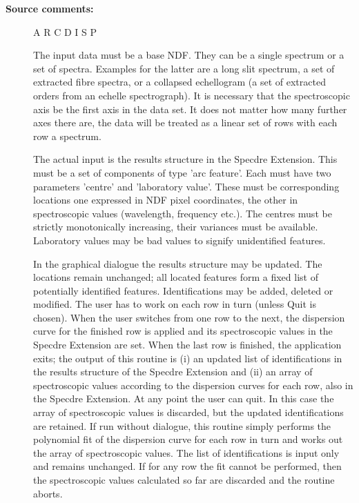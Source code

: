 \begin{description}
\begin{description}
\end{description}

\item [\textbf{Source comments:}]
\begin{terminalv}
   A R C D I S P

   The input data must be a base NDF. They can be a single spectrum
   or a set of spectra. Examples for the latter are a long slit
   spectrum, a set of extracted fibre spectra, or a collapsed
   echellogram (a set of extracted orders from an echelle
   spectrograph). It is necessary that the spectroscopic axis be the
   first axis in the data set. It does not matter how many further
   axes there are, the data will be treated as a linear set of rows
   with each row a spectrum.

   The actual input is the results structure in the Specdre
   Extension. This must be a set of components of type 'arc
   feature'. Each must have two parameters 'centre' and 'laboratory
   value'. These must be corresponding locations one expressed in
   NDF pixel coordinates, the other in spectroscopic values
   (wavelength, frequency etc.). The centres must be strictly
   monotonically increasing, their variances must be available.
   Laboratory values may be bad values to signify unidentified
   features.

   In the graphical dialogue the results structure may be updated.
   The locations remain unchanged; all located features form a fixed
   list of potentially identified features. Identifications may be
   added, deleted or modified. The user has to work on each row in
   turn (unless Quit is chosen). When the user switches from one row
   to the next, the dispersion curve for the finished row is applied
   and its spectroscopic values in the Specdre Extension are set.
   When the last row is finished, the application exits; the output
   of this routine is (i) an updated list of identifications in the
   results structure of the Specdre Extension and (ii) an array of
   spectroscopic values according to the dispersion curves for each
   row, also in the Specdre Extension. At any point the user can
   quit. In this case the array of spectroscopic values is
   discarded, but the updated identifications are retained. If run
   without dialogue, this routine simply performs the polynomial fit
   of the dispersion curve for each row in turn and works out the
   array of spectroscopic values. The list of identifications is
   input only and remains unchanged. If for any row the fit cannot
   be performed, then the spectroscopic values calculated so far are
   discarded and the routine aborts.


\end{terminalv}
\end{description}
